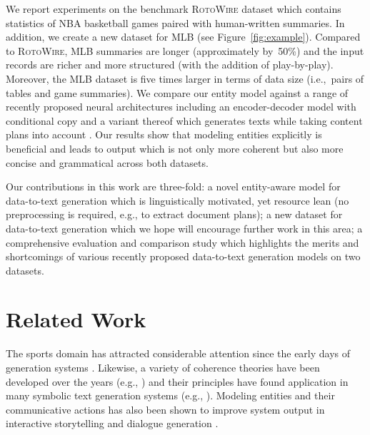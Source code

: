 \documentclass[11pt,a4paper]{article}
\begin{document}
We report experiments on the benchmark \textsc{RotoWire} dataset
\cite{D17-1239} which contains statistics of NBA basketball games
paired with human-written summaries. In addition, we create a new
dataset for MLB (see Figure~\ref{fig:example}).  Compared to
\textsc{RotoWire}, MLB summaries are longer (approximately by~50\%)
and the input records are richer and more structured (with the
addition of play-by-play). Moreover, the MLB dataset is five times
larger in terms of data size (i.e.,~pairs of tables and game
summaries). We compare our entity model against a range of recently
proposed neural architectures including an encoder-decoder model with
conditional copy \cite{D17-1239} and a variant thereof which generates
texts while taking content plans into account
\cite{DBLP:journals/corr/abs-1809-00582}. Our results show that
modeling entities explicitly is beneficial and leads to output which
is not only more coherent but also more concise and grammatical across
both datasets.

Our contributions in this work are three-fold: a novel entity-aware
model for data-to-text generation which is linguistically motivated,
yet resource lean (no preprocessing is required, e.g., to extract
document plans); a new dataset for data-to-text generation which we
hope will encourage further work in this area; a comprehensive
evaluation and comparison study which highlights the merits and
shortcomings of various recently proposed data-to-text generation
models on two datasets.





\section{Related Work}

The sports domain has attracted considerable attention since the early
days of generation systems
\cite{robin1994revision,P98-2209}. Likewise, a variety of coherence
theories have been developed over the years (e.g.,
\citealt{Mann:Thomson:88,DBLP:journals/coling/GroszJW95}) and their principles
have found application in many symbolic text generation systems (e.g.,
\citealt{Scott:Souza:90,DBLP:journals/coling/KibbleP04}). Modeling entities and their
communicative actions has also been shown to improve system
output in interactive storytelling
\cite{cavazza2002character,cavazza2005dialogue} and dialogue
generation \cite{walker2011perceived}.
\end{document}
